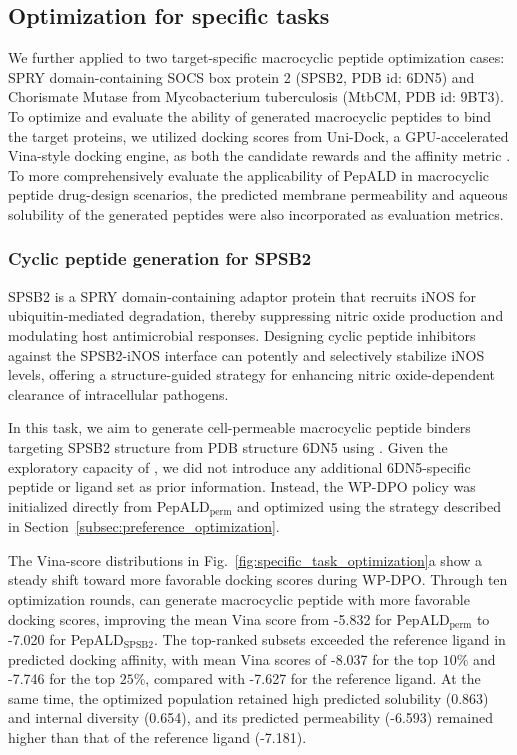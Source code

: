 \subsection{Optimization for specific tasks}\label{subsec:specific_task_optimization}

We further applied \mytool to two target-specific macrocyclic peptide optimization cases: SPRY domain-containing SOCS box protein 2 (SPSB2, PDB id: 6DN5) and Chorismate Mutase from Mycobacterium tuberculosis (MtbCM, PDB id: 9BT3).
To optimize and evaluate the ability of generated macrocyclic peptides to bind the target proteins, we utilized docking scores from Uni-Dock, a GPU-accelerated Vina-style docking engine, as both the candidate rewards and the affinity metric \citep{ref_unidock}.
To more comprehensively evaluate the applicability of PepALD in macrocyclic peptide drug-design scenarios, the predicted membrane permeability and aqueous solubility of the generated peptides were also incorporated as evaluation metrics.

\subsubsection{Cyclic peptide generation for SPSB2}\label{subsubsec:spsb2_generation}

SPSB2 is a SPRY domain-containing adaptor protein that recruits iNOS for ubiquitin-mediated degradation, thereby suppressing nitric oxide production and modulating host antimicrobial responses.
Designing cyclic peptide inhibitors against the SPSB2-iNOS interface can potently and selectively stabilize iNOS levels, offering a structure-guided strategy for enhancing nitric oxide-dependent clearance of intracellular pathogens.

In this task, we aim to generate cell-permeable macrocyclic peptide binders targeting SPSB2 structure from PDB structure 6DN5 using \mytool.
Given the exploratory capacity of \mytool, we did not introduce any additional 6DN5-specific peptide or ligand set as prior information.
Instead, the WP-DPO policy was initialized directly from PepALD$_{\mathrm{perm}}$ and optimized using the strategy described in Section~\ref{subsec:preference_optimization}.

The Vina-score distributions in Fig.~\ref{fig:specific_task_optimization}a show a steady shift toward more favorable docking scores during WP-DPO.
Through ten optimization rounds, \mytool can generate macrocyclic peptide with more favorable docking scores, improving the mean Vina score from -5.832 for PepALD$_{\mathrm{perm}}$ to -7.020 for PepALD$_{\mathrm{SPSB2}}$.
The top-ranked subsets exceeded the reference ligand in predicted docking affinity, with mean Vina scores of -8.037 for the top $10\%$ and -7.746 for the top $25\%$, compared with -7.627 for the reference ligand.
At the same time, the optimized population retained high predicted solubility (0.863) and internal diversity (0.654), and its predicted permeability (-6.593) remained higher than that of the reference ligand (-7.181).

